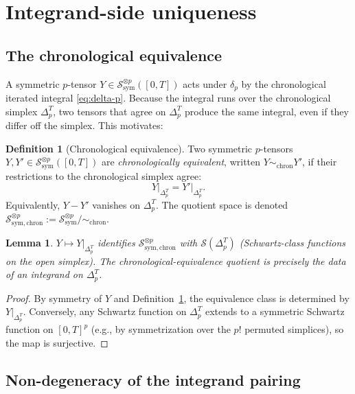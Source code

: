 \documentclass[11pt,reqno]{amsart}
\theoremstyle{plain}
\newtheorem{lemma}[theorem]{Lemma}
\theoremstyle{definition}
\newtheorem{definition}[theorem]{Definition}
\newcommand{\sym}{\mathrm{sym}}
\newcommand{\Schw}{\mathcal{S}}
\newcommand{\simplex}{\Delta_p^T}
\newcommand{\chron}{\mathrm{chron}}
\begin{document}
\section{Integrand-side uniqueness}

\subsection{The chronological equivalence}

A symmetric $p$-tensor $Y \in \Schw_{\sym}^{\otimes p}([0,T])$ acts under $\delta_p$ by the chronological iterated integral \eqref{eq:delta-p}. Because the integral runs over the chronological simplex $\simplex$, two tensors that agree on $\simplex$ produce the same integral, even if they differ off the simplex. This motivates:

\begin{definition}[Chronological equivalence]
\label{def:chron-equiv}
Two symmetric $p$-tensors $Y, Y' \in \Schw_{\sym}^{\otimes p}([0,T])$ are \emph{chronologically equivalent}, written $Y \sim_{\chron} Y'$, if their restrictions to the chronological simplex agree:
\begin{equation}
\label{eq:chronological-equivalence}
Y\big|_{\simplex} = Y'\big|_{\simplex}.
\end{equation}
Equivalently, $Y - Y'$ vanishes on $\simplex$. The quotient space is denoted $\Schw_{\sym, \chron}^{\otimes p} := \Schw_{\sym}^{\otimes p} / \sim_{\chron}$.
\end{definition}

\begin{lemma}
$Y \mapsto Y|_{\simplex}$ identifies $\Schw_{\sym, \chron}^{\otimes p}$ with $\Schw(\simplex)$ (Schwartz-class functions on the open simplex). The chronological-equivalence quotient is precisely the data of an integrand on $\simplex$.
\end{lemma}

\begin{proof}
By symmetry of $Y$ and Definition~\ref{def:chron-equiv}, the equivalence class is determined by $Y|_{\simplex}$. Conversely, any Schwartz function on $\simplex$ extends to a symmetric Schwartz function on $[0,T]^p$ (e.g., by symmetrization over the $p!$ permuted simplices), so the map is surjective.
\end{proof}

\subsection{Non-degeneracy of the integrand pairing}
\end{document}
